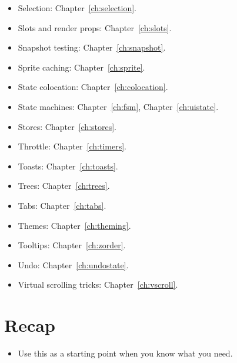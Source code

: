 \begin{itemize}[leftmargin=*]
  \item Selection: Chapter~\ref{ch:selection}.
  \item Slots and render props:
    Chapter~\ref{ch:slots}.
  \item Snapshot testing: Chapter~\ref{ch:snapshot}.
  \item Sprite caching: Chapter~\ref{ch:sprite}.
  \item State colocation: Chapter~\ref{ch:colocation}.
  \item State machines: Chapter~\ref{ch:fsm},
    Chapter~\ref{ch:uistate}.
  \item Stores: Chapter~\ref{ch:stores}.
  \item Throttle: Chapter~\ref{ch:timers}.
  \item Toasts: Chapter~\ref{ch:toasts}.
  \item Trees: Chapter~\ref{ch:trees}.
  \item Tabs: Chapter~\ref{ch:tabs}.
  \item Themes: Chapter~\ref{ch:theming}.
  \item Tooltips: Chapter~\ref{ch:zorder}.
  \item Undo: Chapter~\ref{ch:undostate}.
  \item Virtual scrolling tricks:
    Chapter~\ref{ch:vscroll}.
\end{itemize}

\section{Recap}

\begin{recap}
\begin{itemize}[leftmargin=*]
  \item Use this as a starting point when you know what
    you need.
\end{itemize}
\end{recap}
